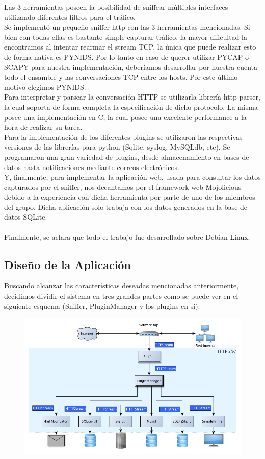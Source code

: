Las 3 herramientas poseen la posibilidad de sniffear múltiples interfaces utilizando diferentes filtros para el tráfico. 
\\Se implementó un pequeño sniffer http con las 3 herramientas mencionadas. Si bien con todas ellas es bastante simple capturar tráfico, la mayor dificultad la encontramos al intentar rearmar el stream TCP, la única que puede realizar esto de forma nativa es PYNIDS. Por lo tanto en caso de querer utilizar PYCAP o SCAPY para nuestra implementación, deberíamos desarrollar por nuestra cuenta todo el ensamble y las conversaciones TCP entre los hosts. Por este último motivo elegimos PYNIDS.
\\Para interpretar y parsear la conversación HTTP se utilizarla librería http-parser, la cual soporta de forma completa la especificación de dicho protocolo. La misma posee una implementación en C, la cual posee una excelente performance a la hora de realizar su tarea.
\\Para la implementación de los diferentes plugins se utilizaron las respectivas versiones de las librerías para python (Sqlite, syslog, MySQLdb, etc). Se programaron una gran variedad de plugins, desde almacenamiento en bases de datos hasta notificaciones mediante correos electrónicos.
\\Y, finalmente, para implementar la aplicación web, usada para consultar los datos capturados por el sniffer, nos decantamos por el framework web Mojolicious debido a la experiencia con dicha herramienta por parte de uno de los miembros del grupo. Dicha aplicación solo trabaja con los datos generados en la base de datos SQLite.
\\
\\\indent Finalmente, se aclara que todo el trabajo fue desarrollado sobre Debian Linux.

\subsection{Diseño de la Aplicación}

Buscando alcanzar las características deseadas mencionadas anteriormente, decidimos dividir el sistema en tres grandes partes como se puede ver en el siguiente esquema (Sniffer, PluginManager y los plugins en sí):

\begin{figure}[hbtp]
    \centering
	\includegraphics[width=\textwidth]{img/modelo.png}
\end{figure}

